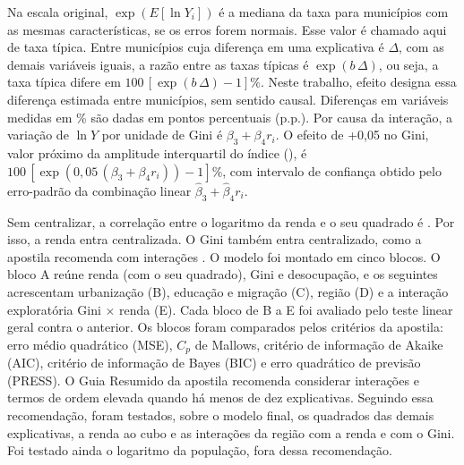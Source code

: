 \documentclass[a4paper,11pt]{article}
\begin{document}
Na escala original, $\exp(E[\ln Y_i])$ é a mediana da taxa para municípios com as mesmas características, se os erros forem normais. Esse valor é chamado aqui de taxa típica. Entre municípios cuja diferença em uma explicativa é $\Delta$, com as demais variáveis iguais, a razão entre as taxas típicas é $\exp(b\,\Delta)$, ou seja, a taxa típica difere em $100\,[\exp(b\,\Delta) - 1]\%$. Neste trabalho, efeito designa essa diferença estimada entre municípios, sem sentido causal. Diferenças em variáveis medidas em \% são dadas em pontos percentuais (p.p.). Por causa da interação, a variação de $\ln Y$ por unidade de Gini é $\beta_3 + \beta_4 r_i$. O efeito de +0,05 no Gini, valor próximo da amplitude interquartil do índice (\nIqrGini), é $100\,[\exp(0{,}05\,(\beta_3 + \beta_4 r_i)) - 1]\%$, com intervalo de confiança obtido pelo erro-padrão da combinação linear $\hat\beta_3 + \hat\beta_4 r_i$.

Sem centralizar, a correlação entre o logaritmo da renda e o seu quadrado é \nCorQuadSem. Por isso, a renda entra centralizada. O Gini também entra centralizado, como a apostila recomenda com interações \citep[cap.~7]{ferrari2023}. O modelo foi montado em cinco blocos. O bloco A reúne renda (com o seu quadrado), Gini e desocupação, e os seguintes acrescentam urbanização (B), educação e migração (C), região (D) e a interação exploratória Gini $\times$ renda (E). Cada bloco de B a E foi avaliado pelo teste linear geral contra o anterior. Os blocos foram comparados pelos critérios da apostila: erro médio quadrático (MSE), $C_p$ de Mallows, critério de informação de Akaike (AIC), critério de informação de Bayes (BIC) e erro quadrático de previsão (PRESS). O Guia Resumido da apostila \citep[cap.~5]{ferrari2023} recomenda considerar interações e termos de ordem elevada quando há menos de dez explicativas. Seguindo essa recomendação, foram testados, sobre o modelo final, os quadrados das demais explicativas, a renda ao cubo e as interações da região com a renda e com o Gini. Foi testado ainda o logaritmo da população, fora dessa recomendação.
\end{document}
